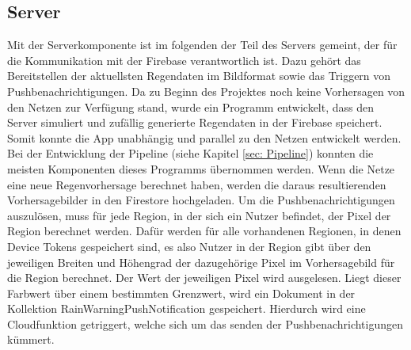 \subsection{Server}\label{server}
\begin{sloppypar}
Mit der Serverkomponente ist im folgenden der Teil des Servers gemeint, der für die Kommunikation mit der Firebase verantwortlich ist. 
Dazu gehört das Bereitstellen der aktuellsten Regendaten im Bildformat sowie das Triggern von Pushbenachrichtigungen. 
Da zu Beginn des Projektes noch keine Vorhersagen von den Netzen zur Verfügung stand, wurde ein Programm entwickelt, dass den Server simuliert und zufällig generierte Regendaten in der Firebase speichert. 
Somit konnte die App unabhängig und parallel zu den Netzen entwickelt werden.
Bei der Entwicklung der Pipeline (siehe Kapitel \ref{sec: Pipeline}) konnten die meisten Komponenten dieses Programms übernommen werden. 
Wenn die Netze eine neue Regenvorhersage berechnet haben, werden die daraus resultierenden Vorhersagebilder in den Firestore hochgeladen. 
Um die Pushbenachrichtigungen auszulösen, muss für jede Region, in der sich ein Nutzer befindet, der Pixel der Region berechnet werden. 
Dafür werden für alle vorhandenen Regionen, in denen Device Tokens gespeichert sind, es also Nutzer in der Region gibt über den jeweiligen Breiten und Höhengrad der dazugehörige Pixel im Vorhersagebild für die Region berechnet. 
Der Wert der jeweiligen Pixel wird ausgelesen. Liegt dieser Farbwert über einem bestimmten Grenzwert, wird ein Dokument in der Kollektion RainWarningPushNotification gespeichert. 
Hierdurch wird eine Cloudfunktion getriggert, welche sich um das senden der Pushbenachrichtigungen kümmert.
\end{sloppypar}